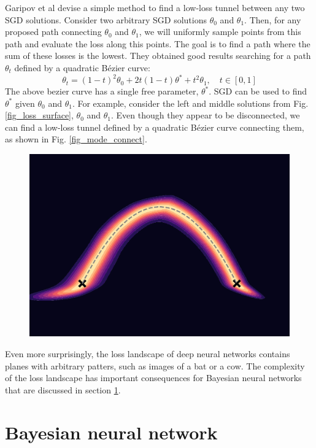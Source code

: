 \documentclass[12pt]{article}
\begin{document}
Garipov et al \cite{mode_connect} devise a simple method to find a low-loss tunnel between any two SGD solutions. Consider two arbitrary SGD solutions $\theta_0$ and $\theta_1$. Then, for any proposed path connecting $\theta_0$ and $\theta_1$, we will uniformly sample points from this path and evaluate the loss along this points. The goal is to find a path where the sum of these losses is the lowest. They obtained good results searching for a path $\theta_t$ defined by a quadratic Bézier curve:
$$
\theta_t = (1-t)^2 \theta_0 + 2t(1-t) \theta^* + t^2 \theta_1, \quad t \in [0, 1]
$$
The above bezier curve has a single free parameter, $\theta^*$. SGD can be used to find $\theta^*$ given $\theta_0$ and $\theta_1$. For example, consider the left and middle solutions from Fig. \ref{fig_loss_surface}, $\theta_0$ and $\theta_1$. Even though they appear to be disconnected, we can find a low-loss tunnel defined by a quadratic Bézier curve connecting them, as shown in Fig. \ref{fig_mode_connect}.

\begin{figure}[h]
\centering
\includegraphics[width=12cm]{plots/mode_connectivity.pdf}
\caption{}
\label{fig_mode_connectivity}
\end{figure}

Even more surprisingly, the loss landscape of deep neural networks contains planes with arbitrary patters, such as images of a bat or a cow. \cite{sightseeing} The complexity of the loss landscape has important consequences for Bayesian neural networks that are discussed in section \ref{}.

\section{Bayesian neural network}
\end{document}

